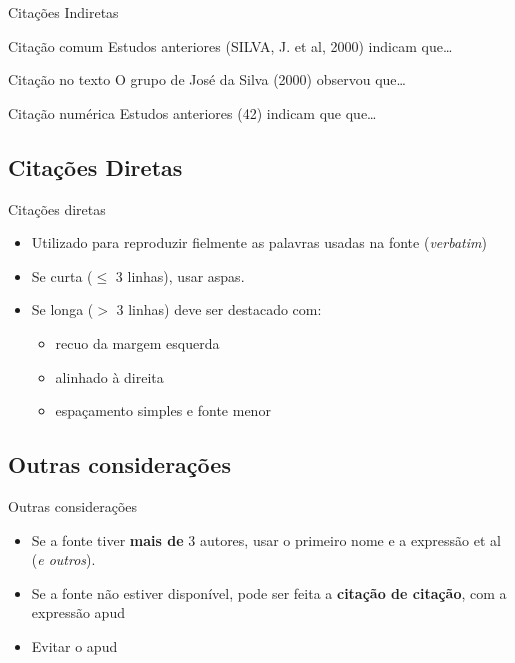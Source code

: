 \documentclass{beamer}
\begin{document}
\begin{frame}{Citações Indiretas}
  \begin{exampleblock}{Citação comum}
    Estudos anteriores \alert{(SILVA, J. et al, 2000)} indicam
    que\ldots
  \end{exampleblock}
  \bigskip
  \begin{exampleblock}{Citação no texto}
    O grupo de José da Silva \alert{(2000)} observou que\ldots
  \end{exampleblock}
  \bigskip
  \begin{exampleblock}{Citação numérica}
    Estudos anteriores \alert{(42)} indicam que que\ldots
  \end{exampleblock}
\end{frame}

\subsection{Citações Diretas}

\begin{frame}{Citações diretas}
  \begin{itemize}
    \footnotesize
  \item Utilizado para reproduzir fielmente as palavras usadas na
    fonte ({\em verbatim})
    \bigskip
  \item Se curta ($\leq$ 3 linhas), usar aspas.
    \bigskip
  \item Se longa ($>$ 3 linhas) deve ser destacado com:
    \begin{itemize}
      \scriptsize
    \item recuo da margem esquerda
    \item alinhado à direita
    \item espaçamento simples e fonte menor
    \end{itemize}
  \end{itemize}
\end{frame}

\subsection{Outras considerações}

\begin{frame}{Outras considerações}
  \begin{itemize}
    \footnotesize
  \item Se a fonte tiver {\bf mais de} 3 autores, usar o primeiro nome
    e a expressão \alert{et al} ({\em e outros}).
    \bigskip
  \item Se a fonte não estiver disponível, pode ser feita a {\bf
      citação de citação}, com a expressão \alert{apud}
    \bigskip
  \item Evitar o apud
  \end{itemize}
\end{frame}
\end{document}
